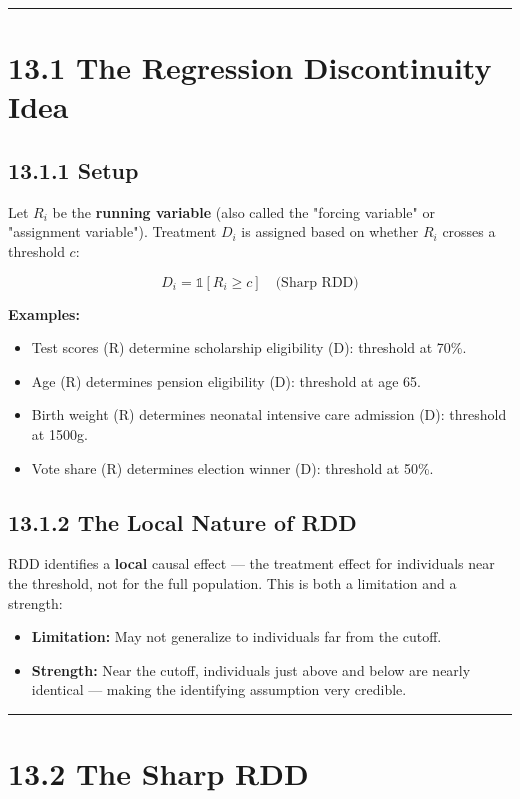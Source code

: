 \medskip\hrule\medskip

\section{13.1 The Regression Discontinuity Idea}

\subsection{13.1.1 Setup}

Let $R_i$ be the \textbf{running variable} (also called the "forcing variable" or "assignment variable"). Treatment $D_i$ is assigned based on whether $R_i$ crosses a threshold $c$:

\[
D_i = \mathbb{1}[R_i \geq c] \quad \text{(Sharp RDD)}
\]

\textbf{Examples:}
\begin{itemize}
\item Test scores (R) determine scholarship eligibility (D): threshold at 70\%.
\item Age (R) determines pension eligibility (D): threshold at age 65.
\item Birth weight (R) determines neonatal intensive care admission (D): threshold at 1500g.
\item Vote share (R) determines election winner (D): threshold at 50\%.
\end{itemize}

\subsection{13.1.2 The Local Nature of RDD}

RDD identifies a \textbf{local} causal effect --- the treatment effect for individuals near the threshold, not for the full population. This is both a limitation and a strength:

\begin{itemize}
\item \textbf{Limitation:} May not generalize to individuals far from the cutoff.
\item \textbf{Strength:} Near the cutoff, individuals just above and below are nearly identical --- making the identifying assumption very credible.
\end{itemize}

\medskip\hrule\medskip

\section{13.2 The Sharp RDD}

